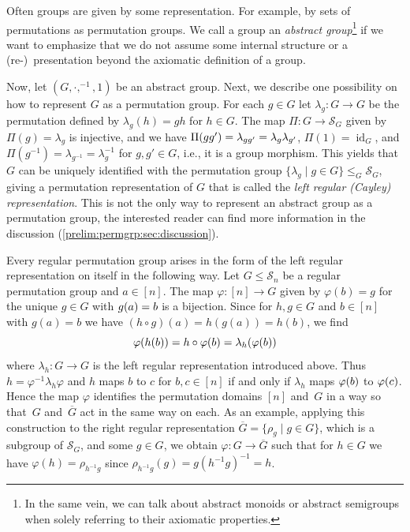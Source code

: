 
Often groups are given by some representation. For example, by sets of permutations as permutation groups. We call a group an \emph{abstract group}\footnote{In the same vein, we can talk about abstract monoids or abstract semigroups when solely referring to their axiomatic properties.}	
if we want to emphasize that 
we do not assume some internal structure or a \mbox{(re-)}~presentation beyond the axiomatic definition of a group.

Now, let $(G, \cdot, ^{-1}, 1)$ be an abstract group. Next, we describe one possibility on
how to represent $G$ as a permutation group. For each $g \in G$
let $\lambda_g \colon G \to G$ be the permutation
defined by $\lambda_g(h) = gh$ for $h \in G$.
The map $\Pi \colon G \to \mathcal S_G$ given by $\Pi(g) = \lambda_g$
is injective, and we have $\Pi(gg') = \lambda_{gg'} = \concat{\lambda_{g'}}{\lambda_g}$, $\Pi(1) = \operatorname{id}_G$,
and $\Pi(g^{-1}) = \lambda_{g^{-1}} = \lambda_g^{-1}$ for $g,g' \in G$, i.e., it is a group morphism.
This yields that $G$
can be uniquely identified with the permutation group $\{ \lambda_g \mid g \in G\} \le_G \mathcal S_G$,
giving a permutation representation of $G$ that is called 
the \emph{left regular (Cayley) representation}.
This is not the only way 
to represent an abstract group as a permutation group, 
the interested reader can find more information in the discussion (\cref{prelim:permgrp:sec:discussion}).

\begin{remark}
	Every regular permutation group arises in the form of the 
	left regular representation on itself
	in the following way.
	Let $G \le \mathcal S_n$ be a regular permutation group
	and $a \in [n]$.
	The map $\varphi \colon [n] \to G$ given by $\varphi(b) = g$ for the unique $g \in G$
	with $\applyfunc{a}{g} = b$ is a bijection.
	Since for $h,g \in G$ and $b \in [n]$ with $g(a) = b$ we have $(h \circ g)(a) = h(g(a)) = h(b)$,
	we find
	\[
	\applyfunc{\applyfunc{b}{h}}{\varphi} = h \circ \applyfunc{b}{\varphi} = \applyfunc{\applyfunc{b}{\varphi}}{\lambda_h}
	\] 
	where $\lambda_h \colon G \to G$ is the left regular representation introduced above.
	Thus $h = \varphi^{-1} \lambda_h \varphi$
	and $h$ maps $b$ to $c$ for $b,c \in [n]$
	if and only if $\lambda_h$ maps 
	$\applyfunc{b}{\varphi}$ to $\applyfunc{c}{\varphi}$.
	Hence the map $\varphi$ identifies the permutation domains $[n]$ and~$G$ in a way
	so that~$G$ and~$\overline{G}$ act in the same way on each.
	As an example, applying this construction to the right regular representation $\overline{G} = \{ \rho_g \mid g \in G \}$, which is a subgroup of $\mathcal S_G$, and some $g \in G$,
	we obtain  $\varphi \colon G \to \overline{G}$
	such that for $h \in G$  
	we have $\varphi(h) = \rho_{h^{-1}g}$
	since $\rho_{h^{-1}g}(g) = g(h^{-1}g)^{-1} = h$.
\end{remark}

